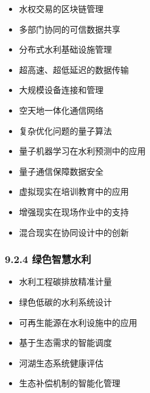\begin{itemize}
\tightlist
\item
  水权交易的区块链管理
\item
  多部门协同的可信数据共享
\item
  分布式水利基础设施管理
\end{itemize}


\begin{itemize}
\tightlist
\item
  超高速、超低延迟的数据传输
\item
  大规模设备连接和管理
\item
  空天地一体化通信网络
\end{itemize}


\begin{itemize}
\tightlist
\item
  复杂优化问题的量子算法
\item
  量子机器学习在水利预测中的应用
\item
  量子通信保障数据安全
\end{itemize}


\begin{itemize}
\tightlist
\item
  虚拟现实在培训教育中的应用
\item
  增强现实在现场作业中的支持
\item
  混合现实在协同设计中的创新
\end{itemize}

\hypertarget{ux7effux8272ux667aux6167ux6c34ux5229}{%
\subsubsection{9.2.4 绿色智慧水利}\label{ux7effux8272ux667aux6167ux6c34ux5229}}


\begin{itemize}
\tightlist
\item
  水利工程碳排放精准计量
\item
  绿色低碳的水利系统设计
\item
  可再生能源在水利设施中的应用
\end{itemize}


\begin{itemize}
\tightlist
\item
  基于生态需求的智能调度
\item
  河湖生态系统健康评估
\item
  生态补偿机制的智能化管理
\end{itemize}

